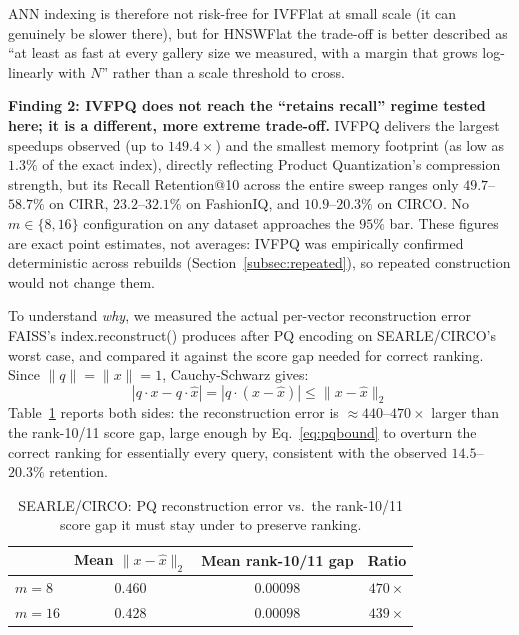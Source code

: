 \documentclass[conference]{IEEEtran}
\begin{document}
ANN indexing is therefore not risk-free for IVFFlat at small scale (it can genuinely be slower there), but for HNSWFlat the trade-off is better described as ``at least as fast at every gallery size we measured, with a margin that grows log-linearly with $N$'' rather than a scale threshold to cross.

\vspace{0.05cm}
\noindent\textbf{Finding 2: IVFPQ does not reach the ``retains recall'' regime tested here; it is a different, more extreme trade-off.} IVFPQ delivers the largest speedups observed (up to $149.4\times$) and the smallest memory footprint (as low as $1.3\%$ of the exact index), directly reflecting Product Quantization's compression strength, but its Recall Retention@10 across the entire sweep ranges only $49.7$--$58.7\%$ on CIRR, $23.2$--$32.1\%$ on FashionIQ, and $10.9$--$20.3\%$ on CIRCO. No $m \in \{8, 16\}$ configuration on any dataset approaches the $95\%$ bar. These figures are exact point estimates, not averages: IVFPQ was empirically confirmed deterministic across rebuilds (Section~\ref{subsec:repeated}), so repeated construction would not change them.

To understand \emph{why}, we measured the actual per-vector reconstruction error FAISS's index.reconstruct() produces after PQ encoding on SEARLE/CIRCO's worst case, and compared it against the score gap needed for correct ranking. Since $\|q\|{=}\|x\|{=}1$, Cauchy-Schwarz gives:
\begin{equation}
|q \cdot x - q \cdot \hat{x}| = |q \cdot (x - \hat{x})| \leq \|x - \hat{x}\|_2
\label{eq:pqbound}
\end{equation}
Table~\ref{tab:pqerror} reports both sides: the reconstruction error is $\approx\!440$--$470\times$ larger than the rank-10/11 score gap, large enough by Eq.~\eqref{eq:pqbound} to overturn the correct ranking for essentially every query, consistent with the observed $14.5$--$20.3\%$ retention.

\begin{table}[!ht]
\caption{SEARLE/CIRCO: PQ reconstruction error vs.\ the rank-10/11 score gap it must stay under to preserve ranking.}
\label{tab:pqerror}
\renewcommand{\arraystretch}{0.8}
\begin{tabular*}{\linewidth}{@{\extracolsep{\fill}}lccc}
\toprule
& \textbf{Mean} $\|x-\hat{x}\|_2$ & \textbf{Mean rank-10/11 gap} & \textbf{Ratio} \\
\midrule
$m=8$  & $0.460$ & $0.00098$ & $470\times$ \\
$m=16$ & $0.428$ & $0.00098$ & $439\times$ \\
\bottomrule
\end{tabular*}
\end{table}
\end{document}
